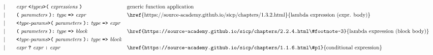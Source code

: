 \begin{alignat*}{9}
&&                       && |   &\quad &&   \textit{expr} \ 
                                            \code{<} \textit{types} \code{>}
                                            \textbf{\texttt{(}}\ \textit{expressions}\
                                            \textbf{\texttt{)}}
                                                           && \textrm{generic function application}\\
&&                       && |   &\quad &&   \textbf{\texttt{(}}\ \textit{parameters}\ \textbf{\texttt{):}}\ 
                                            \textit{type}\ 
                                            \texttt{\textbf{=>}}\ \textit{expr}
                                                           && \textrm{\href{https://source-academy.github.io/sicp/chapters/1.3.2.html}{lambda expression (expr. body)}}\\
&&                       && |   &\quad &&   \code{<} \textit{type-params} \code{>}
                                            \textbf{\texttt{(}}\ \textit{parameters}\ \textbf{\texttt{):}}\ 
                                            \textit{type}\ 
                                            \texttt{\textbf{=>}}\ \textit{expr}
                                                           \\
&&                       && |   &\quad &&   \textbf{\texttt{(}}\ \textit{parameters}\ \textbf{\texttt{):}}\
                                            \textit{type}\ 
                                            \texttt{\textbf{=>}}\ \textit{block}
                                                           && \textrm{\href{https://source-academy.github.io/sicp/chapters/2.2.4.html\#footnote-3}{lambda expression (block body)}}\\
&&                       && |   &\quad &&   \code{<} \textit{type-params} \code{>}
                                            \textbf{\texttt{(}}\ \textit{parameters}\ \textbf{\texttt{):}}\ 
                                            \textit{type}\ 
                                            \texttt{\textbf{=>}}\ \textit{block}
                                                           \\
&&                       && |   &\quad &&   \textit{expr} \ \textbf{\texttt{?}}\ 
                                            \textit{expr}
                                            \ \textbf{\texttt{:}}\
                                            \textit{expr}\
                                                           && \textrm{\href{https://source-academy.github.io/sicp/chapters/1.1.6.html\#p1}{conditional expression}}\\

\end{alignat*}
